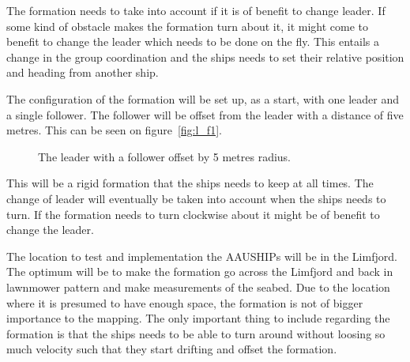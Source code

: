 The formation needs to take into account if it is of benefit to change leader. If some kind of obstacle makes the formation turn about it, it might come to benefit to change the leader which needs to be done on the fly. This entails a change in the group coordination and the ships needs to set their relative position and heading from another ship.

The configuration of the formation will be set up, as a start, with one leader and a single follower. The follower will be offset from the leader with a distance of five metres. This can be seen on figure~\vref{fig:l_f1}.
\begin{figure}[htbp]
	\centering
	
	\caption{The leader with a follower offset by 5 metres radius.}
	\label{fig:l_f1}
\end{figure}
This will be a rigid formation that the ships needs to keep at all times. The change of leader will eventually be taken into account when the ships needs to turn. If the formation needs to turn clockwise about it might be of benefit to change the leader. 

The location to test and implementation the AAUSHIPs will be in the Limfjord. The optimum will be to make the formation go across the Limfjord and back in lawnmower pattern and make measurements of the seabed. Due to the location where it is presumed to have enough space, the formation is not of bigger importance to the mapping. The only important thing to include regarding the formation is that the ships needs to be able to turn around without loosing so much velocity such that they start drifting and offset the formation.
